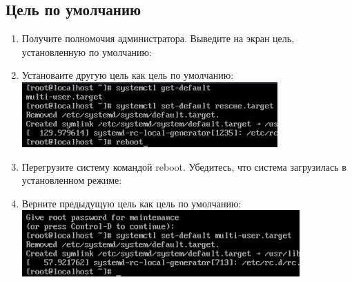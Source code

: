 \documentclass[12pt]{article}
\begin{document}
\subsection{Цель по умолчанию}
\begin{enumerate}
	\item Получите полномочия администратора. Выведите на экран цель, установленную по умолчанию: \\
	\item Установаите другую цель как цель по умолчанию: \\
	      \includegraphics{17.png}
	\item Перегрузите систему командой reboot. Убедитесь, что система загрузилась в установленном режиме:
	\item Верните предыдущую цель как цель по умолчанию: \\
	      \includegraphics{18.png}
\end{enumerate}
\end{document}
